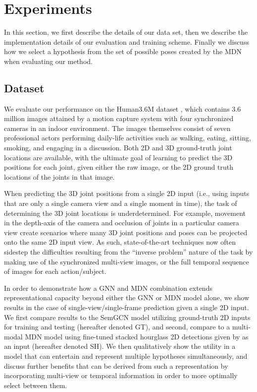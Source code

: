 \section{Experiments}\label{experiments}

In this section, we first describe the details of our data set, then we describe the implementation details of our evaluation and training scheme. Finally we discuss how we select a hypothesis from the set of possible poses created by the MDN when evaluating our method.

\subsection{Dataset}\label{experiments_dataset}

   We evaluate our performance on the Human3.6M dataset \cite{ionescu2013human3}, which contains 3.6 million images attained by a motion capture system with four synchronized cameras in an indoor environment. The images themselves consist of seven professional actors performing daily-life activities such as walking, eating, sitting, smoking, and engaging in a discussion. Both 2D and 3D ground-truth joint locations are available, with the ultimate goal of learning to predict the 3D positions for each joint, given either the raw image, or the 2D ground truth locations of the joints in that image. 
   
   When predicting the 3D joint positions from a single 2D input (i.e., using inputs that are only a single camera view and a single moment in time), the task of determining the 3D joint locations is underdetermined. For example, movement in the depth-axis of the camera and occlusion of joints in a particular camera view create scenarios where many 3D joint positions and poses can be projected onto the same 2D input view. As such, state-of-the-art techniques now often sidestep the difficulties resulting from the ``inverse problem'' nature of the task by making use of the synchronized multi-view images, or the full temporal sequence of images for each action/subject. 
   
   In order to demonstrate how a GNN and MDN combination extends representational capacity beyond either the GNN or MDN model alone, we show results in the case of single-view/single-frame prediction given a single 2D input. We first compare results to the SemGCN model utilizing ground-truth 2D inputs for training and testing (hereafter denoted GT), and second, compare to a multi-modal MDN model using fine-tuned stacked hourglass 2D detections given by \cite{martinez2017simple} as an input (hereafter denoted SH). We then qualitatively show the utility in a model that can entertain and represent multiple hypotheses simultaneously, and discuss further benefits that can be derived from such a representation by incorporating multi-view or temporal information in order to more optimally select between them. 

